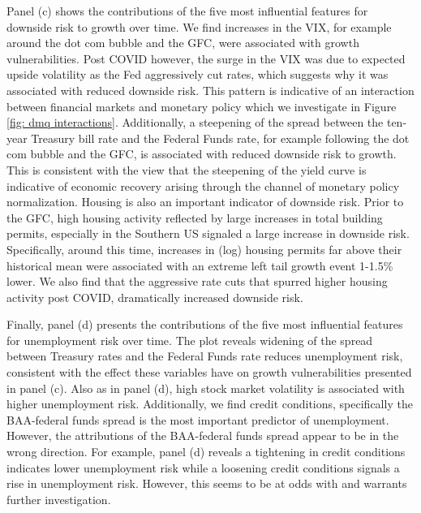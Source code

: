 \documentclass[12pt]{article}
\begin{document}
Panel (c) shows the contributions of the five most influential features for downside risk to growth over time. We find increases in the VIX, for example around the dot com bubble and the GFC, were associated with growth vulnerabilities. Post COVID however, the surge in the VIX was due to expected upside volatility as the Fed aggressively cut rates, which suggests why it was associated with reduced downside risk. This pattern is indicative of an interaction between financial markets and monetary policy which we investigate in Figure \ref{fig: dmq interactions}. Additionally, a steepening of the spread between the ten-year Treasury bill rate and the Federal Funds rate, for example following the dot com bubble and the GFC, is associated with reduced downside risk to growth. This is consistent with the view that the steepening of the yield curve is indicative of economic recovery arising through the channel of monetary policy normalization. Housing is also an important indicator of downside risk. Prior to the GFC, high housing activity reflected by large increases in total building permits, especially in the Southern US signaled a large increase in downside risk. Specifically, around this time, increases in (log) housing permits far above their historical mean were associated with an extreme left tail growth event 1-1.5\% lower. We also find that the aggressive rate cuts that spurred higher housing activity post COVID, dramatically increased downside risk. 

Finally, panel (d) presents the contributions of the five most influential features for unemployment risk over time. The plot reveals widening of the spread between Treasury rates and the Federal Funds rate reduces unemployment risk, consistent with the effect these variables have on growth vulnerabilities presented in panel (c). Also as in panel (d), high stock market volatility is associated with higher unemployment risk. Additionally, we find credit conditions, specifically the BAA-federal funds spread is the most important predictor of unemployment. However, the attributions of the BAA-federal funds spread appear to be in the wrong direction. For example, panel (d) reveals a tightening in credit conditions indicates lower unemployment risk while a loosening credit conditions signals a rise in unemployment risk. However, this seems to be at odds with \cite{gilchristCreditSpreadsBusiness2012} and warrants further investigation. 

\end{document}
